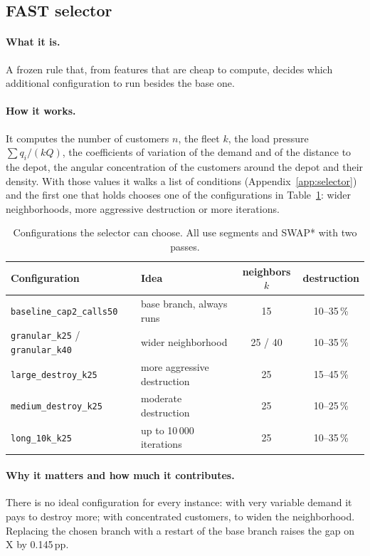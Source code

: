 \documentclass[11pt,a4paper]{article}
\newcommand{\pp}{\,pp}
\newcommand{\tsl}[1]{\texttt{\small #1}}
\begin{document}
\subsection{FAST selector}
\label{sec:fast}

\paragraph{What it is.} A frozen rule that, from features that are cheap to compute, decides which
additional configuration to run besides the base one.

\paragraph{How it works.} It computes the number of customers $n$, the fleet $k$, the load pressure
$\sum q_i/(kQ)$, the coefficients of variation of the demand and of the distance to the depot, the
angular concentration of the customers around the depot and their density. With those values it
walks a list of conditions (Appendix~\ref{app:selector}) and the first one that holds chooses one of
the configurations in Table~\ref{tab:ramas}: wider neighborhoods, more aggressive destruction or more
iterations.

\begin{table}[H]
\centering
\caption{Configurations the selector can choose. All use segments and SWAP* with two passes.}
\label{tab:ramas}
\small
\begin{tabular}{@{}llcc@{}}
\toprule
Configuration & Idea & neighbors $k$ & destruction \\
\midrule
\tsl{baseline\_cap2\_calls50} & base branch, always runs & 15 & 10--35\,\% \\
\tsl{granular\_k25} / \tsl{granular\_k40} & wider neighborhood & 25 / 40 & 10--35\,\% \\
\tsl{large\_destroy\_k25} & more aggressive destruction & 25 & 15--45\,\% \\
\tsl{medium\_destroy\_k25} & moderate destruction & 25 & 10--25\,\% \\
\tsl{long\_10k\_k25} & up to 10\,000 iterations & 25 & 10--35\,\% \\
\bottomrule
\end{tabular}
\end{table}

\paragraph{Why it matters and how much it contributes.} There is no ideal configuration for every
instance: with very variable demand it pays to destroy more; with concentrated customers, to widen
the neighborhood. Replacing the chosen branch with a restart of the base branch raises the gap on X
by 0.145\pp{}.
\end{document}
